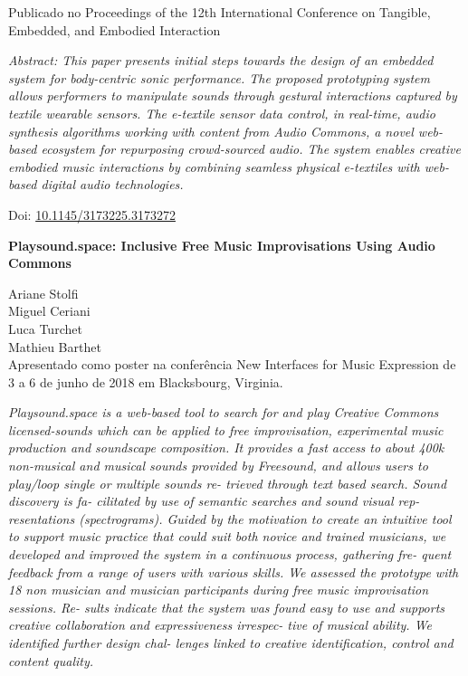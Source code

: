 Publicado no Proceedings of the 12th International Conference on Tangible, Embedded, and Embodied Interaction

\textit{Abstract: This paper presents initial steps towards the design of an embedded system for body-centric sonic performance. The proposed prototyping system allows performers to manipulate sounds through gestural interactions captured by textile wearable sensors. The e-textile sensor data control, in real-time, audio synthesis algorithms working with content from Audio Commons, a novel web-based ecosystem for repurposing crowd-sourced audio. The system enables creative embodied music interactions by combining seamless physical e-textiles with web-based digital audio technologies.}

Doi: \url{10.1145/3173225.3173272}


\textbf{Playsound.space: Inclusive Free Music Improvisations Using Audio Commons}

Ariane Stolfi\\
Miguel Ceriani \\
Luca Turchet\\
Mathieu Barthet\\

Apresentado como poster na conferência New Interfaces for Music Expression de 3 a 6 de junho de 2018 em Blacksbourg, Virginia.

\textit{Playsound.space is a web-based tool to search for and play Creative Commons licensed-sounds which can be applied to free improvisation, experimental music production and soundscape composition. It provides a fast access to about 400k non-musical and musical sounds provided by Freesound, and allows users to play/loop single or multiple sounds re- trieved through text based search. Sound discovery is fa- cilitated by use of semantic searches and sound visual rep- resentations (spectrograms). Guided by the motivation to create an intuitive tool to support music practice that could suit both novice and trained musicians, we developed and improved the system in a continuous process, gathering fre- quent feedback from a range of users with various skills. We assessed the prototype with 18 non musician and musician participants during free music improvisation sessions. Re- sults indicate that the system was found easy to use and supports creative collaboration and expressiveness irrespec- tive of musical ability. We identified further design chal- lenges linked to creative identification, control and content quality.}



